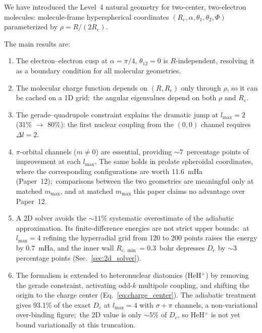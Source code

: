 \documentclass[aps,pra,twocolumn,superscriptaddress,longbibliography]{revtex4-2}
\begin{document}
We have introduced the Level~4 natural geometry for two-center,
two-electron molecules: molecule-frame hyperspherical coordinates
$(R_e,\alpha,\theta_1,\theta_2,\Phi)$ parameterized by
$\rho = R/(2R_e)$.

The main results are:
\begin{enumerate}
  \item The electron--electron cusp at $\alpha = \pi/4$,
    $\theta_{12} = 0$ is $R$-independent, resolving it as a boundary
    condition for all molecular geometries.
  \item The molecular charge function depends on $(R,R_e)$ only through
    $\rho$, so it can be cached on a 1D grid;\ the angular eigenvalues
    depend on both $\rho$ and $R_e$.
  \item The gerade--quadrupole constraint explains the dramatic jump at
    $l_{\max}=2$ (31\% $\to$ 80\%): the first nuclear coupling from
    the $(0,0)$ channel requires $\Delta l = 2$.
  \item $\pi$-orbital channels ($m \ne 0$) are essential, providing
    ${\sim}7$~percentage points of improvement at each $l_{\max}$.
    The same holds in prolate spheroidal coordinates, where the
    corresponding configurations are worth 11.6~mHa (Paper~12);\
    comparisons between the two geometries are meaningful only at
    matched $m_{\max}$, and at matched $m_{\max}$ this paper claims
    no advantage over Paper~12.
  \item A 2D solver avoids the ${\sim}11\%$ systematic
    overestimate of the adiabatic approximation.  Its finite-difference
    energies are not strict upper bounds:\ at $l_{\max}=4$ refining
    the hyperradial grid from 120 to 200 points raises the energy by
    $0.7$~mHa, and the inner wall $R_{e,\min} = 0.3$~bohr depresses
    $D_e$ by ${\sim}3$ percentage points (Sec.~\ref{sec:2d_solver}).
  \item The formalism is extended to heteronuclear diatomics (HeH$^+$)
    by removing the gerade constraint, activating odd-$k$ multipole
    coupling, and shifting the origin to the charge center
    (Eq.~\ref{eq:charge_center}).  The adiabatic treatment gives
    93.1\% of the exact $D_e$ at $l_{\max} = 4$ with $\sigma{+}\pi$
    channels, a non-variational over-binding figure;\ the 2D value is
    only $\sim\!5\%$ of $D_e$, so HeH$^+$ is not yet bound
    variationally at this truncation.
\end{enumerate}
\end{document}
